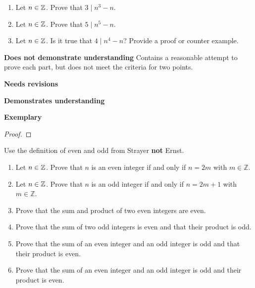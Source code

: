 \documentclass[letterpaper, 11pt]{../ximera}
\begin{document}
\begin{ex}
 	\begin{enumerate}[label=(\alph*)]
		\item Let $n\in\mathbb Z$. Prove that $3\mid n^3-n$.
		\item Let $n\in\mathbb Z$. Prove that $5\mid n^5-n$.
		\item Let $n\in\mathbb Z$. Is it true that $4\mid n^4-n$? Provide a proof or counter example.
	\end{enumerate}
\end{ex}

\begin{writeRubric}
    \item \textbf{Does not demonstrate understanding}
     Contains a reasonable attempt to prove each part, but does not meet the criteria for two points.
    \item \textbf{Needs revisions}
     
    \item \textbf{Demonstrates understanding}
    
    \item \textbf{Exemplary}
        
\end{writeRubric}
                                       
\begin{proof}
\end{proof}

\begin{ex} Use the definition of even and odd from Strayer \textbf{not} Ernst.
 \begin{enumerate}[label=(\alph*)]
 		\item Let $n\in\mathbb Z$. Prove that $n$ is an even integer if and only if $n=2m$ with $m\in\mathbb{Z}$.
		\item Let $n\in\mathbb Z$. Prove that $n$ is an odd integer if and only if $n=2m+1$ with $m\in\mathbb{Z}$.
		\item Prove that the sum and product of two even integers are even.
		\item Prove that the sum of two odd integers is even and that their product is odd.
		\item Prove that the sum of an even integer and an odd integer is odd and that their product is even.
		\item Prove that the sum of an even integer and an odd integer is odd and their product is even.
	\end{enumerate}

\end{ex}
\end{document}
